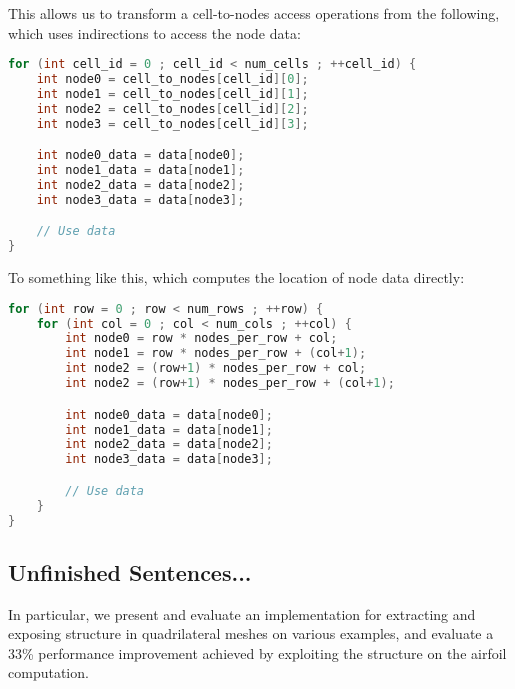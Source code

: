 This allows us to transform a cell-to-nodes access operations from the following, which uses indirections to access the node data:
\begin{lstlisting}[language=c++]
for (int cell_id = 0 ; cell_id < num_cells ; ++cell_id) {
	int node0 = cell_to_nodes[cell_id][0];
	int node1 = cell_to_nodes[cell_id][1];
	int node2 = cell_to_nodes[cell_id][2];
	int node3 = cell_to_nodes[cell_id][3];

	int node0_data = data[node0];
	int node1_data = data[node1];
	int node2_data = data[node2];
	int node3_data = data[node3];

	// Use data
}
\end{lstlisting}

To something like this, which computes the location of node data directly:
\begin{lstlisting}[language=c++]
for (int row = 0 ; row < num_rows ; ++row) {
	for (int col = 0 ; col < num_cols ; ++col) {
		int node0 = row * nodes_per_row + col;
		int node1 = row * nodes_per_row + (col+1);
		int node2 = (row+1) * nodes_per_row + col;
		int node2 = (row+1) * nodes_per_row + (col+1);

		int node0_data = data[node0];
		int node1_data = data[node1];
		int node2_data = data[node2];
		int node3_data = data[node3];

		// Use data
	}
}
\end{lstlisting}


\subsection{Unfinished Sentences...}
In particular, we present and evaluate an implementation for extracting and exposing structure in quadrilateral meshes on various examples, and evaluate a 33\% performance improvement achieved by exploiting the structure on the airfoil computation.
